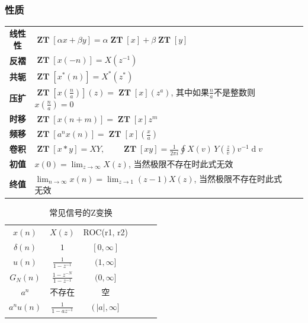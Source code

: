 \documentclass{ctexart}
\DeclareMathOperator{\ZT}{\mathbf{ZT}}
\DeclareMathOperator{\ud}{\mathrm{d}}
\newlength{\Oldarrayrulewidth}
\newcommand{\Hline}[1]{
  \noalign{\global\setlength{\Oldarrayrulewidth}{\arrayrulewidth}}
  \noalign{\global\setlength{\arrayrulewidth}{#1}}\hline
  \noalign{\global\setlength{\arrayrulewidth}{\Oldarrayrulewidth}}}
\newcommand{\Topline}{\Hline{0.08em}}
\newcommand{\Bottomline}{\Hline{0.08em}}
\newcommand{\Midline}{\Hline{0.05em}}
\begin{document}
\subsubsection{性质}
    \begin{center}
    \begin{tabularx}{\textwidth}{>{\bfseries}Sl  SL}
        线性性 &  $\displaystyle \ZT[\alpha x + \beta y] = \alpha \ZT[x] + \beta \ZT[y]$\\
        反褶 & $\displaystyle \ZT[x(-n)] = X(z^{-1})$\\
        共轭 & $\displaystyle \ZT[x^*(n)] = X^*(z^*)$\\
        压扩 & $\displaystyle \ZT\left[x(\frac{n}{a})\right](z) = \ZT[x](z^a)$, 其中如果$\frac{n}{a}$不是整数则$x(\frac{n}{a}) = 0$\\
        时移 & $\displaystyle \ZT[x(n + m)] = \ZT[x]z^m$\\
        频移 & $\displaystyle \ZT[a^n x(n)] = \ZT[x]\left(\frac{x}{a}\right)$\\
        卷积 & $\displaystyle \ZT[x * y] = X Y,\qquad \ZT[x y] = \frac{1}{2 \pi i} \oint X(v) \,Y\!\left( \frac{z}{v} \right) v^{-1}\ud v  $\\
        初值 & $\displaystyle x(0) = \lim_{z \to \infty} X(z)$, 当然极限不存在时此式无效\\
        终值 & $\displaystyle \lim_{n \to \infty} x(n) = \lim_{z \to 1} (z - 1) X(z)$, 当然极限不存在时此式无效\\
    \end{tabularx}
    \end{center}

    \begin{table}[ht!]
    \centering
    \begin{tabularx}{\textwidth}{|SCSCSC|}
            \Topline $\displaystyle x(n)$ & $\displaystyle X(z)$ & ROC(r1, r2) \\ \Midline
            $\displaystyle \delta(n) $ & $\displaystyle 1 $ & $\displaystyle [0, \infty]$ \\
            $\displaystyle u(n) $ & $\displaystyle \frac{1}{1 - z^{-1}}$ & $\displaystyle (1, \infty] $\\
            $\displaystyle G_N(n) $ & $\displaystyle \frac{1 - z^{-N}}{1 - z^{-1}}  $ & $\displaystyle (0, \infty] $\\
            $\displaystyle a^n $ & 不存在 & 空 \\
            $\displaystyle a^nu(n) $ & $\displaystyle \frac{1}{1 - az^{-1}}$ & $\displaystyle (\,|a|, \infty]  $\\
            \Bottomline
    \end{tabularx}
    \caption{常见信号的Z变换}
    \end{table}
\end{document}
